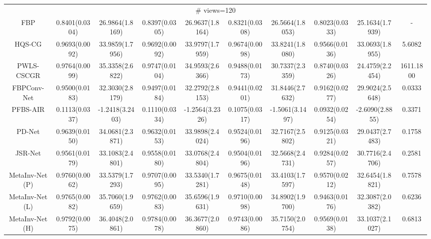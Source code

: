 \documentclass[journal,twoside]{IEEEtran}
\begin{document}
\begin{table*}[ht]
\begin{tabular}{|c|c|c|c|c|c|c|c|c|c|}
  
 \multicolumn{10}{|c|}{\cellcolor{gbygreen}\# views=120} \\
  \cline{1-10}
FBP
&0.8401(0.0304) &26.9864(1.8169) 
&0.8397(0.0305) &26.9637(1.8164) 
&0.8321(0.0308) &26.5664(1.8053) 
&0.8023(0.0333) &25.1634(1.7939) &-\\
  \cline{1-10}
 HQS-CG 
&0.9693(0.0092) &33.9859(1.7956) 
&0.9692(0.0092) &33.9797(1.7959) 
&0.9674(0.0098) &33.8241(1.8080) 
&0.9566(0.0136) &\cellcolor{gbyblue}33.0693(1.8955) &5.6082\\
    \cline{1-10}
PWLS-CSCGR 
&0.9764(0.0099) &35.3358(2.6822) 
&0.9747(0.0104) &34.9593(2.6366) 
&0.9488(0.0173) &30.7337(2.3359) 
&0.8740(0.0326) &24.4759(2.2454) &1611.1800\\
    \cline{1-10}
 FBPConv-Net 
&0.9500(0.0183) &32.3030(2.8179) 
&0.9497(0.0184) &32.2792(2.8153) 
&0.9441(0.0201) &31.8446(2.7632) 
&0.9162(0.0277) &29.9024(2.5648) &0.0333\\
    \cline{1-10}
 PFBS-AIR 
&0.1113(0.0337) &-1.2418(3.2403) 
&0.1110(0.0334) &-1.2564(3.2326) 
&0.1075(0.0317) &-1.5061(3.1497) 
&0.0932(0.0254) &-2.6090(2.8855) &0.3371\\
    \cline{1-10}
  PD-Net
&0.9639(0.0150) &34.0681(2.3871) 
&0.9632(0.0153) &33.9898(2.4024) 
&0.9524(0.0196) &32.7167(2.5802) 
&0.9125(0.0321) &29.0437(2.7483) &0.1758\\
  \cline{1-10}
  JSR-Net
&0.9561(0.0179) &33.1083(2.4801) 
&0.9558(0.0180) &33.0768(2.4804) 
&0.9504(0.0196) &32.5668(2.4731) 
&0.9284(0.0257) &30.7716(2.4706) &0.2581\\
  \cline{1-10}
  MetaInv-Net (P)
&0.9760(0.0062) &33.5379(1.7293) 
&0.9707(0.0095) &33.5340(1.7281) 
&0.9675(0.0148) &33.4103(1.7597)
&\cellcolor{gbypink}0.9570(0.0212) &32.6454(1.8821) &0.7578\\
  \cline{1-10}
MetaInv-Net (L) 
&\cellcolor{gbyblue}0.9765(0.0082) &\cellcolor{gbyblue}35.7060(1.9659) 
&\cellcolor{gbyblue}0.9762(0.0083) &\cellcolor{gbyblue}35.6596(1.9631) 
&\cellcolor{gbyblue}0.9710(0.0098) &\cellcolor{gbyblue}34.8902(1.9700) 
&0.9463(0.0176) &32.3087(2.0382) &0.6236\\
   \cline{1-10}
 MetaInv-Net (H)
&\cellcolor{gbypink}0.9792(0.0075) &\cellcolor{gbypink}36.4048(2.0861) 
&\cellcolor{gbypink}0.9784(0.0078) &\cellcolor{gbypink}36.3677(2.0860) 
&\cellcolor{gbypink}0.9743(0.0086) &\cellcolor{gbypink}35.7150(2.0754) 
&\cellcolor{gbyblue}0.9569(0.0138) &\cellcolor{gbypink}33.1037(2.1027) &0.6813\\
   \cline{1-10}
   

\end{tabular}
\end{table*}
\end{document}
